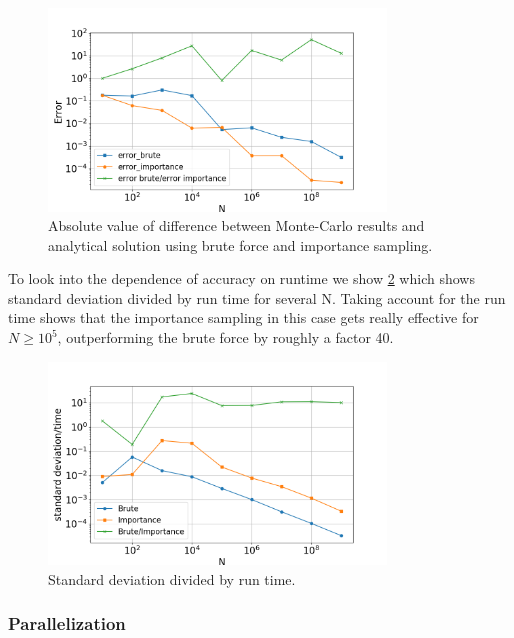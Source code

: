 \begin{figure}[H]
  \centering
  \includegraphics[width=0.8\textwidth]{../figures/mc_error.png}
  \caption{Absolute value of difference between Monte-Carlo results and analytical
  solution using brute force and importance sampling.}

  \label{fig:mc_error}
\end{figure}

To look into the dependence of accuracy on runtime we show \cref{fig:mc_std_time}
which shows standard deviation divided by run time for several N. Taking account
for the run time shows that the importance sampling in this case gets really
effective for $N \geq 10^5$, outperforming the brute force by roughly a factor
40.

\begin{figure}[H]
  \centering
  \includegraphics[width=0.8\textwidth]{../figures/mc_std_time.png}
  \caption{Standard deviation divided by run time.}

  \label{fig:mc_std_time}
\end{figure}

\subsubsection{Parallelization}

